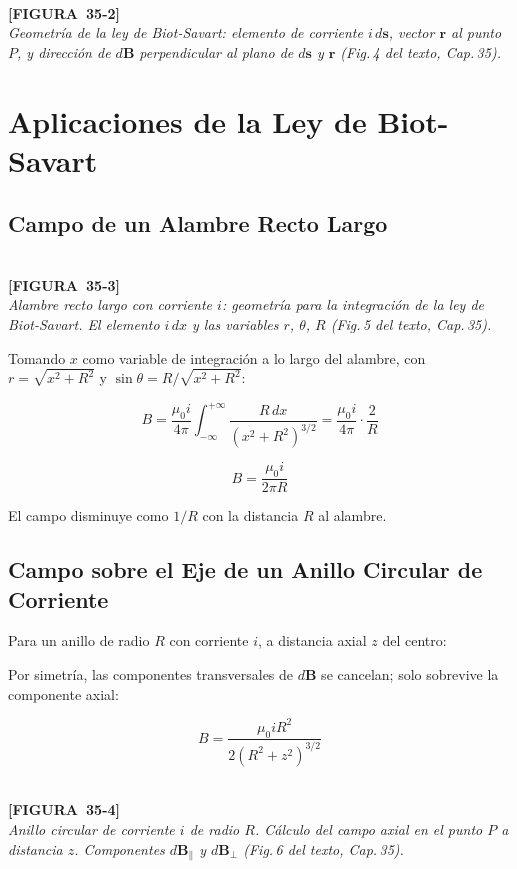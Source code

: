 \documentclass[12pt, letterpaper]{report}
\numberwithin{equation}{section}
\newcommand{\vB}[1]{\boldsymbol{#1}}          %
\newcommand{\figplaceholder}[2]{%
  \begin{tcolorbox}[figbox]
    \centering
    \textcolor{NavyBlue!50}{\rule{0pt}{2.8cm}}\\[4pt]
    {\small\color{NavyBlue}\textbf{[FIGURA\ #1]}\\[2pt]
    \textit{#2}}
  \end{tcolorbox}
}
\begin{document}
\figplaceholder{35-2}{Geometría de la ley de Biot-Savart: elemento de corriente
$i\,d\vB{s}$, vector $\vB{r}$ al punto $P$, y dirección de $d\vB{B}$
perpendicular al plano de $d\vB{s}$ y $\vB{r}$ (Fig.\,4 del texto, Cap.\,35).}

\section{Aplicaciones de la Ley de Biot-Savart}

\subsection{Campo de un Alambre Recto Largo}

\figplaceholder{35-3}{Alambre recto largo con corriente $i$: geometría para
la integración de la ley de Biot-Savart. El elemento $i\,dx$ y las
variables $r$, $\theta$, $R$ (Fig.\,5 del texto, Cap.\,35).}

Tomando $x$ como variable de integración a lo largo del alambre,
con $r=\sqrt{x^2+R^2}$ y $\sin\theta=R/\sqrt{x^2+R^2}$:

\[
  B = \frac{\mu_0 i}{4\pi}\int_{-\infty}^{+\infty}
      \frac{R\,dx}{(x^2+R^2)^{3/2}}
    = \frac{\mu_0 i}{4\pi}\cdot\frac{2}{R}
\]

\begin{equation}
  \boxed{B = \frac{\mu_0 i}{2\pi R}}
  \label{eq:Balamlargo}
\end{equation}

El campo disminuye como $1/R$ con la distancia $R$ al alambre.

\subsection{Campo sobre el Eje de un Anillo Circular de Corriente}

Para un anillo de radio $R$ con corriente $i$, a distancia axial $z$
del centro:

Por simetría, las componentes transversales de $d\vB{B}$ se cancelan;
solo sobrevive la componente axial:

\begin{equation}
  \boxed{B = \frac{\mu_0 i R^2}{2(R^2+z^2)^{3/2}}}
  \label{eq:Banillo}
\end{equation}

\figplaceholder{35-4}{Anillo circular de corriente $i$ de radio $R$. Cálculo
del campo axial en el punto $P$ a distancia $z$. Componentes
$d\vB{B}_\parallel$ y $d\vB{B}_\perp$ (Fig.\,6 del texto, Cap.\,35).}
\end{document}
